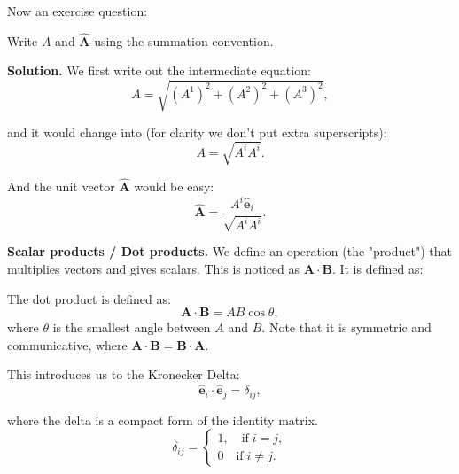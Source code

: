 \documentclass[../main.tex]{subfiles}
\begin{document}
	Now an exercise question:
	\begin{exercise}
		Write $A$ and $\hat{\mathbf{A}}$ using the summation convention. 
		
		\vspace{1\baselineskip}
		\textbf{Solution.} We first write out the intermediate equation:
		\begin{equation}
		  A = \sqrt{\left( A^{1} \right)^{2} + \left( A^{2} \right)^{2} + \left( A^{3} \right)^{2}},
		\end{equation}

		and it would change into (for clarity we don't put extra superscripts):
		\begin{equation} \label{eq0101}
		  A = \sqrt{A^{i}A^{i}}.
		\end{equation}

		And the unit vector $\hat{\mathbf{A}}$ would be easy:
		\begin{equation}
		  \hat{\mathbf{A}} = \frac{A^{i}\hat{\mathbf{e}}_{i}}{\sqrt{A^{i}A^{i}}}.
		\end{equation}
	\end{exercise}

	\textbf{Scalar products / Dot products.} We define an operation (the "product") that multiplies vectors and gives scalars. This is noticed as $\mathbf{A} \cdot \mathbf{B}$. It is defined as:
	\begin{definition}
		The dot product is defined as:
		\begin{equation}
		  \mathbf{A} \cdot \mathbf{B} = AB\cos \theta,
		\end{equation}
		where $\theta$ is the smallest angle between $A$ and $B$. Note that it is symmetric and communicative, where $\mathbf{A} \cdot \mathbf{B} = \mathbf{B} \cdot \mathbf{A}$.
	\end{definition}

	This introduces us to the Kronecker Delta:
	\begin{equation}
	  \hat{\mathbf{e}}_{i} \cdot \hat{\mathbf{e}}_{j} = \delta_{ij},
	\end{equation}
	
	where the delta is a compact form of the identity matrix.
	\begin{equation}
	  \delta_{ij} = \begin{cases} 1, \quad \text{if} \; i=j, \\[2mm] 0 \quad \text{if} \; i \neq j.  \end{cases}
	\end{equation}
\end{document}
